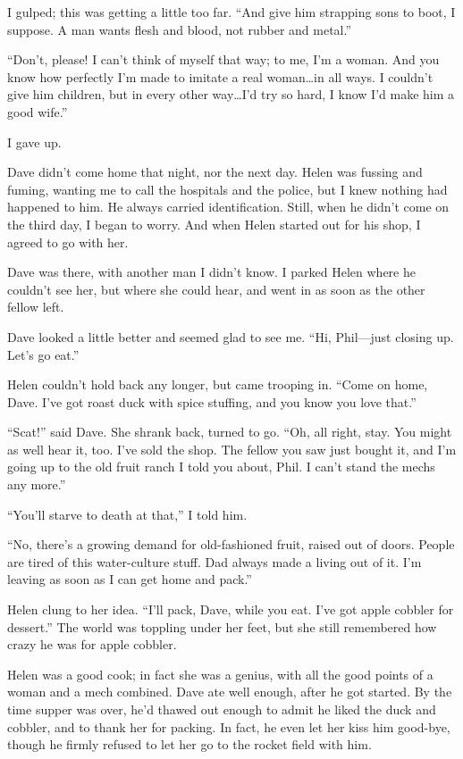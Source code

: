 \documentclass{article}
\begin{document}
I gulped; this was getting a little too far. “And give him strapping sons to boot, I suppose. A man wants flesh and blood, not rubber and metal.”

“Don’t, please! I can’t think of myself that way; to me, I’m a woman. And you know how perfectly I’m made to imitate a real woman…in all ways. I couldn’t give him children, but in every other way…I’d try so hard, I know I’d make him a good wife.”

I gave up.

Dave didn’t come home that night, nor the next day. Helen was fussing and fuming, wanting me to call the hospitals and the police, but I knew nothing had happened to him. He always carried identification. Still, when he didn’t come on the third day, I began to worry. And when Helen started out for his shop, I agreed to go with her.

Dave was there, with another man I didn’t know. I parked Helen where he couldn’t see her, but where she could hear, and went in as soon as the other fellow left.

Dave looked a little better and seemed glad to see me. “Hi, Phil—just closing up. Let’s go eat.”

Helen couldn’t hold back any longer, but came trooping in. “Come on home, Dave. I’ve got roast duck with spice stuffing, and you know you love that.”

“Scat!” said Dave. She shrank back, turned to go. “Oh, all right, stay. You might as well hear it, too. I’ve sold the shop. The fellow you saw just bought it, and I’m going up to the old fruit ranch I told you about, Phil. I can’t stand the mechs any more.”

“You’ll starve to death at that,” I told him.

“No, there’s a growing demand for old-fashioned fruit, raised out of doors. People are tired of this water-culture stuff. Dad always made a living out of it. I’m leaving as soon as I can get home and pack.”

Helen clung to her idea. “I’ll pack, Dave, while you eat. I’ve got apple cobbler for dessert.” The world was toppling under her feet, but she still remembered how crazy he was for apple cobbler.

Helen was a good cook; in fact she was a genius, with all the good points of a woman and a mech combined. Dave ate well enough, after he got started. By the time supper was over, he’d thawed out enough to admit he liked the duck and cobbler, and to thank her for packing. In fact, he even let her kiss him good-bye, though he firmly refused to let her go to the rocket field with him.
\end{document}
